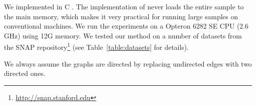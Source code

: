  We implemented \algonameapx in
C\nolinebreak[4]\hspace{-.05em}
. The implementation of \algonameapx never loads the entire sample
to the main memory, which makes it very practical for running large samples on
conventional machines. We run the experiments on a Opteron 6282 SE CPU (2.6
GHz) using 12G memory. We tested our method on a number of datasets from the
SNAP repository\footnote{\url{http://snap.stanford.edu}} (see
Table~\ref{table:datasets} for details).

We always assume the graphs are directed by replacing undirected edges with two directed ones.

